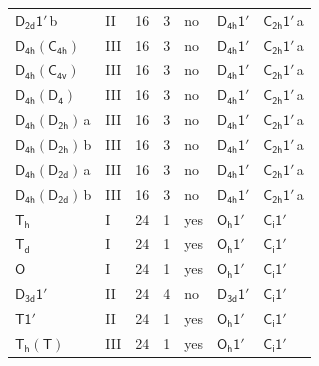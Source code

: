 \documentclass[10pt,a4paper]{article}
\numberwithin{equation}{section}
\newcommand{\grp}[1]{\mathsf{#1}}
\newcommand{\clsletter}[1]{\,{\scriptsize\color{black!55}#1}}
\begin{document}
{\begin{longtable}{@{}llrrlll@{}}
\href{D2d-1p.pdf}{$\grp{D_{2d}1'}$}\clsletter{b} & II & 16 & 3 & no & \href{D4h-1p.pdf}{$\grp{D_{4h}1'}$} & \href{C2h-1p.pdf}{$\grp{C_{2h}1'}$}\clsletter{a}\\
\href{D4h-C4h.pdf}{$\grp{D_{4h}}(\grp{C_{4h}})$} & III & 16 & 3 & no & \href{D4h-1p.pdf}{$\grp{D_{4h}1'}$} & \href{C2h-1p.pdf}{$\grp{C_{2h}1'}$}\clsletter{a}\\
\href{D4h-C4v.pdf}{$\grp{D_{4h}}(\grp{C_{4v}})$} & III & 16 & 3 & no & \href{D4h-1p.pdf}{$\grp{D_{4h}1'}$} & \href{C2h-1p.pdf}{$\grp{C_{2h}1'}$}\clsletter{a}\\
\href{D4h-D4.pdf}{$\grp{D_{4h}}(\grp{D_{4}})$} & III & 16 & 3 & no & \href{D4h-1p.pdf}{$\grp{D_{4h}1'}$} & \href{C2h-1p.pdf}{$\grp{C_{2h}1'}$}\clsletter{a}\\
\href{D4h-D2h.pdf}{$\grp{D_{4h}}(\grp{D_{2h}})$}\clsletter{a} & III & 16 & 3 & no & \href{D4h-1p.pdf}{$\grp{D_{4h}1'}$} & \href{C2h-1p.pdf}{$\grp{C_{2h}1'}$}\clsletter{a}\\
\href{D4h-D2h.pdf}{$\grp{D_{4h}}(\grp{D_{2h}})$}\clsletter{b} & III & 16 & 3 & no & \href{D4h-1p.pdf}{$\grp{D_{4h}1'}$} & \href{C2h-1p.pdf}{$\grp{C_{2h}1'}$}\clsletter{a}\\
\href{D4h-D2d.pdf}{$\grp{D_{4h}}(\grp{D_{2d}})$}\clsletter{a} & III & 16 & 3 & no & \href{D4h-1p.pdf}{$\grp{D_{4h}1'}$} & \href{C2h-1p.pdf}{$\grp{C_{2h}1'}$}\clsletter{a}\\
\href{D4h-D2d.pdf}{$\grp{D_{4h}}(\grp{D_{2d}})$}\clsletter{b} & III & 16 & 3 & no & \href{D4h-1p.pdf}{$\grp{D_{4h}1'}$} & \href{C2h-1p.pdf}{$\grp{C_{2h}1'}$}\clsletter{a}\\
\href{../../../rotation/data/pdf/Th.pdf}{$\grp{T_{h}}$} & I & 24 & 1 & yes & \href{Oh-1p.pdf}{$\grp{O_{h}1'}$} & \href{S2-1p.pdf}{$\grp{C_{i}1'}$}\\
\href{../../../rotation/data/pdf/Td.pdf}{$\grp{T_{d}}$} & I & 24 & 1 & yes & \href{Oh-1p.pdf}{$\grp{O_{h}1'}$} & \href{S2-1p.pdf}{$\grp{C_{i}1'}$}\\
\href{../../../rotation/data/pdf/O.pdf}{$\grp{O}$} & I & 24 & 1 & yes & \href{Oh-1p.pdf}{$\grp{O_{h}1'}$} & \href{S2-1p.pdf}{$\grp{C_{i}1'}$}\\
\href{D3d-1p.pdf}{$\grp{D_{3d}1'}$} & II & 24 & 4 & no & \href{D3d-1p.pdf}{$\grp{D_{3d}1'}$} & \href{S2-1p.pdf}{$\grp{C_{i}1'}$}\\
\href{T-1p.pdf}{$\grp{T1'}$} & II & 24 & 1 & yes & \href{Oh-1p.pdf}{$\grp{O_{h}1'}$} & \href{S2-1p.pdf}{$\grp{C_{i}1'}$}\\
\href{Th-T.pdf}{$\grp{T_{h}}(\grp{T})$} & III & 24 & 1 & yes & \href{Oh-1p.pdf}{$\grp{O_{h}1'}$} & \href{S2-1p.pdf}{$\grp{C_{i}1'}$}\\

\end{longtable}}
\end{document}
